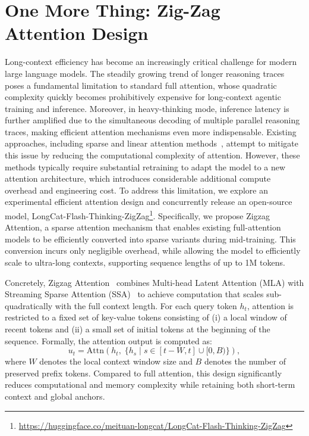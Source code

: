 \documentclass{article}
\begin{document}
\section{One More Thing: Zig-Zag Attention Design}
Long-context efficiency has become an increasingly critical challenge for modern large language models. The steadily growing trend of longer reasoning traces poses a fundamental limitation to standard full attention, whose quadratic complexity quickly becomes prohibitively expensive for long-context agentic training and inference. Moreover, in heavy-thinking mode, inference latency is further amplified due to the simultaneous decoding of multiple parallel reasoning traces, making efficient attention mechanisms even more indispensable.
Existing approaches, including sparse and linear attention methods~\citep{sparse1, sparse2, Linear1, linear2}, attempt to mitigate this issue by reducing the computational complexity of attention. However, these methods typically require substantial retraining to adapt the model to a new attention architecture, which introduces considerable additional compute overhead and engineering cost.
To address this limitation, we explore an experimental efficient attention design and concurrently release an open-source model, LongCat-Flash-Thinking-ZigZag\footnote{\url{https://huggingface.co/meituan-longcat/LongCat-Flash-Thinking-ZigZag}}. Specifically, we propose Zigzag Attention, a sparse attention mechanism that enables existing full-attention models to be efficiently converted into sparse variants during mid-training. This conversion incurs only negligible overhead, while allowing the model to efficiently scale to ultra-long contexts, supporting sequence lengths of up to 1M tokens. 

Concretely, Zigzag Attention~\citep{zhang2026} combines Multi-head Latent Attention (MLA) with Streaming Sparse Attention (SSA)~\citep{DBLP:journals/corr/abs-2410-10819} to achieve computation that scales sub-quadratically with the full context length.
For each query token $h_t$, attention is restricted to a fixed set of key-value tokens consisting of (i) a local window of recent tokens and (ii) a small set of initial tokens at the beginning of the sequence.
Formally, the attention output is computed as:
\begin{equation}
u_t = \mathrm{Attn}\!\left(
h_t,\;
\{h_s \mid s \in [t-W, t] \cup [0, B)\}
\right),
\end{equation}
where $W$ denotes the local context window size and $B$ denotes the number of preserved prefix tokens.
Compared to full attention, this design significantly reduces computational and memory complexity while retaining both short-term context and global anchors.
\end{document}
